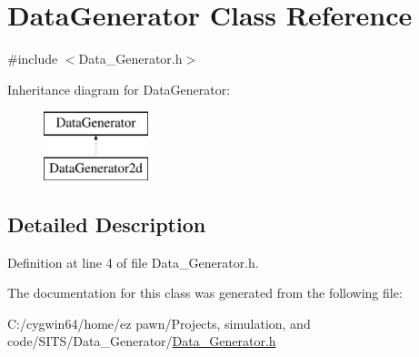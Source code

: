 \hypertarget{class_data_generator}{}\section{Data\+Generator Class Reference}
\label{class_data_generator}


{\ttfamily \#include $<$Data\+\_\+\+Generator.\+h$>$}

Inheritance diagram for Data\+Generator\+:\begin{figure}[H]
\begin{center}
\leavevmode
\includegraphics[height=2.000000cm]{class_data_generator}
\end{center}
\end{figure}


\subsection{Detailed Description}


Definition at line 4 of file Data\+\_\+\+Generator.\+h.



The documentation for this class was generated from the following file\+:\begin{DoxyCompactItemize}
\item 
C\+:/cygwin64/home/ez pawn/\+Projects, simulation, and code/\+S\+I\+T\+S/\+Data\+\_\+\+Generator/\hyperlink{_data___generator_8h}{Data\+\_\+\+Generator.\+h}\end{DoxyCompactItemize}
